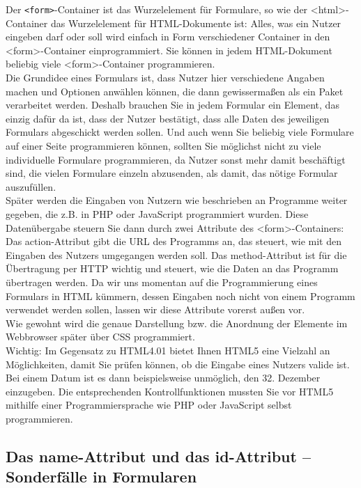 Der \verb|<form>|-Container ist das Wurzelelement für Formulare, so wie der <html>-Container das Wurzelelement für HTML-Dokumente ist: Alles, was ein Nutzer eingeben darf oder soll wird einfach in Form verschiedener Container in den <form>-Container einprogrammiert. Sie können in jedem HTML-Dokument beliebig viele <form>-Container programmieren.\\

Die Grundidee eines Formulars ist, dass Nutzer hier verschiedene Angaben machen und Optionen anwählen können, die dann gewissermaßen als ein Paket verarbeitet werden. Deshalb brauchen Sie in jedem Formular ein Element, das einzig dafür da ist, dass der Nutzer bestätigt, dass alle Daten des jeweiligen Formulars abgeschickt werden sollen. Und auch wenn Sie beliebig viele Formulare auf einer Seite programmieren können, sollten Sie möglichst nicht zu viele individuelle Formulare programmieren, da Nutzer sonst mehr damit beschäftigt sind, die vielen Formulare einzeln abzusenden, als damit, das nötige Formular auszufüllen.\\

Später werden die Eingaben von Nutzern wie beschrieben an Programme weiter gegeben, die z.B. in PHP oder JavaScript programmiert wurden. Diese Datenübergabe steuern Sie dann durch zwei Attribute des <form>-Containers: Das action-Attribut gibt die URL des Programms an, das steuert, wie mit den Eingaben des Nutzers umgegangen werden soll. Das method-Attribut ist für die Übertragung per HTTP wichtig und steuert, wie die Daten an das Programm übertragen werden. Da wir uns momentan auf die Programmierung eines Formulars in HTML kümmern, dessen Eingaben noch nicht von einem Programm verwendet werden sollen, lassen wir diese Attribute vorerst außen vor.\\

Wie gewohnt wird die genaue Darstellung bzw. die Anordnung der Elemente im Webbrowser später über CSS programmiert.\\

Wichtig: Im Gegensatz zu HTML4.01 bietet Ihnen HTML5 eine Vielzahl an Möglichkeiten, damit Sie prüfen können, ob die Eingabe eines Nutzers valide ist. Bei einem Datum ist es dann beispielsweise unmöglich, den 32. Dezember einzugeben. Die entsprechenden Kontrollfunktionen mussten Sie vor HTML5 mithilfe einer Programmiersprache wie PHP oder JavaScript selbst programmieren.

\subsection{Das name-Attribut und das id-Attribut – Sonderfälle in Formularen}

